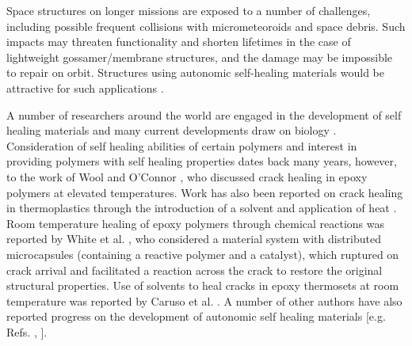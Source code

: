 \documentclass[11pt,letterpaper]{article}%
\begin{document}
Space structures on longer missions are exposed to a number of
challenges, including possible frequent collisions with
micrometeoroids and space debris.  Such impacts may threaten
functionality and shorten lifetimes in the case of lightweight
gossamer/membrane structures, and the damage may be impossible to
repair on orbit.  Structures using autonomic self-healing
materials would be attractive for such applications \cite{lee}.

A number of researchers around the world are engaged in the
development of self healing materials and many current
developments draw on biology \cite{sottos2010}.  Consideration of
self healing abilities of certain polymers and interest in
providing polymers with self healing properties dates back many
years, however, to the work of Wool and O'Connor \cite{wool}, who
discussed crack healing in epoxy polymers at elevated
temperatures.  Work has also been reported on crack healing in
thermoplastics through the introduction of a solvent and
application of heat \cite{wu}.  Room temperature healing of epoxy
polymers through chemical reactions was reported by White et al.
\cite{white}, who considered a material system with distributed
microcapsules (containing a reactive polymer and a catalyst),
which ruptured on crack arrival and facilitated a reaction across
the crack to restore the original structural properties.  Use of
solvents to heal cracks in epoxy thermosets at room temperature
was reported by Caruso et al. \cite{caruso}. A number of other
authors have also reported progress on the development of
autonomic self healing materials [e.g. Refs. \cite{sheng},
\cite{imperiale}].
\end{document}
